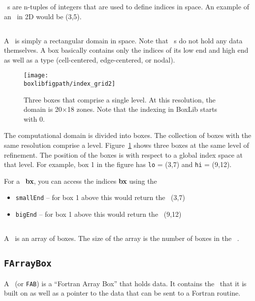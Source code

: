 \IVtype\ s are n-tuples of integers that are used to define
indices in space.    An example of an \IVtype\ in 2D would
be (3,5).

\subsection{\Boxtype}

A \Boxtype\ is simply a rectangular domain in space.  Note that \Boxtype\ s
do not hold any data themselves. A box basically contains
only the indices of its low end and high end as well as a type 
(cell-centered, edge-centered, or nodal).

\begin{figure}[h]
\centering
\texttt{[image: \\boxlibfigpath/index\_grid2]}
\caption[Single-level grid structure]
{\label{fig:boxes} Three boxes that comprise a single level.  At this
  resolution, the domain is 20$\times$18 zones.  Note that the
  indexing in BoxLib starts with $0$.}
\end{figure}

The computational domain is divided into boxes.  The collection of
boxes with the same resolution comprise a level.
Figure~\ref{fig:boxes} shows three boxes at the same level of
refinement.  The position of the boxes is with respect to a global
index space at that level.  For example, box 1 in the figure has 
{\tt lo} = (3,7) and {\tt hi} = (9,12).  

For a \Boxtype\ {\bf bx},
you can access the indices {\bf bx} using the 

\begin{itemize}
\item {\tt smallEnd}  -- for box 1 above this would return the \IVtype\ (3,7)
\item {\tt bigEnd} -- for box 1 above this would return the \IVtype\ (9,12)
\end{itemize}

\subsection{\BoxArray}

A \BoxArray\ is an array of boxes.   The size of the array is the 
number of boxes in the \BoxArray\ .

\subsection{{\tt FArrayBox}}

A \FAB\ (or {\tt FAB}) is a ``Fortran Array Box'' that holds data.  It contains the
\Boxtype\ that it is built on as well as a pointer to the data 
that can be sent to a Fortran routine.
 

